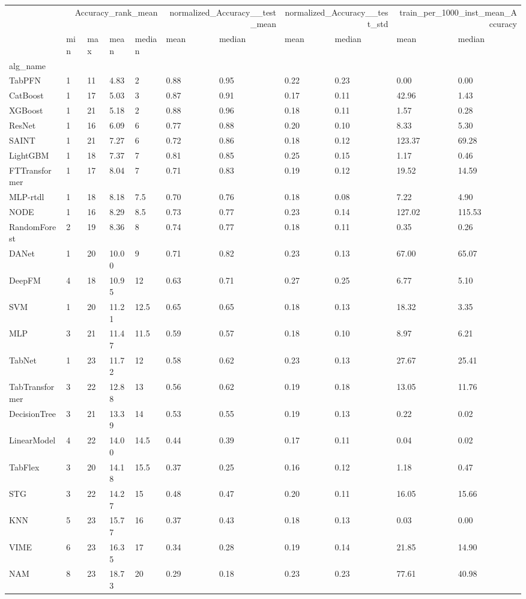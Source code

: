 \begin{tabular}{lllllllllll}
\toprule
 & \multicolumn{4}{r}{Accuracy_rank_mean} & \multicolumn{2}{r}{normalized_Accuracy__test_mean} & \multicolumn{2}{r}{normalized_Accuracy__test_std} & \multicolumn{2}{r}{train_per_1000_inst_mean_Accuracy} \\
 & min & max & mean & median & mean & median & mean & median & mean & median \\
alg_name &  &  &  &  &  &  &  &  &  &  \\
\midrule
TabPFN & 1 & 11 & 4.83 & 2 & 0.88 & 0.95 & 0.22 & 0.23 & 0.00 & 0.00 \\
CatBoost & 1 & 17 & 5.03 & 3 & 0.87 & 0.91 & 0.17 & 0.11 & 42.96 & 1.43 \\
XGBoost & 1 & 21 & 5.18 & 2 & 0.88 & 0.96 & 0.18 & 0.11 & 1.57 & 0.28 \\
ResNet & 1 & 16 & 6.09 & 6 & 0.77 & 0.88 & 0.20 & 0.10 & 8.33 & 5.30 \\
SAINT & 1 & 21 & 7.27 & 6 & 0.72 & 0.86 & 0.18 & 0.12 & 123.37 & 69.28 \\
LightGBM & 1 & 18 & 7.37 & 7 & 0.81 & 0.85 & 0.25 & 0.15 & 1.17 & 0.46 \\
FTTransformer & 1 & 17 & 8.04 & 7 & 0.71 & 0.83 & 0.19 & 0.12 & 19.52 & 14.59 \\
MLP-rtdl & 1 & 18 & 8.18 & 7.5 & 0.70 & 0.76 & 0.18 & 0.08 & 7.22 & 4.90 \\
NODE & 1 & 16 & 8.29 & 8.5 & 0.73 & 0.77 & 0.23 & 0.14 & 127.02 & 115.53 \\
RandomForest & 2 & 19 & 8.36 & 8 & 0.74 & 0.77 & 0.18 & 0.11 & 0.35 & 0.26 \\
DANet & 1 & 20 & 10.00 & 9 & 0.71 & 0.82 & 0.23 & 0.13 & 67.00 & 65.07 \\
DeepFM & 4 & 18 & 10.95 & 12 & 0.63 & 0.71 & 0.27 & 0.25 & 6.77 & 5.10 \\
SVM & 1 & 20 & 11.21 & 12.5 & 0.65 & 0.65 & 0.18 & 0.13 & 18.32 & 3.35 \\
MLP & 3 & 21 & 11.47 & 11.5 & 0.59 & 0.57 & 0.18 & 0.10 & 8.97 & 6.21 \\
TabNet & 1 & 23 & 11.72 & 12 & 0.58 & 0.62 & 0.23 & 0.13 & 27.67 & 25.41 \\
TabTransformer & 3 & 22 & 12.88 & 13 & 0.56 & 0.62 & 0.19 & 0.18 & 13.05 & 11.76 \\
DecisionTree & 3 & 21 & 13.39 & 14 & 0.53 & 0.55 & 0.19 & 0.13 & 0.22 & 0.02 \\
LinearModel & 4 & 22 & 14.00 & 14.5 & 0.44 & 0.39 & 0.17 & 0.11 & 0.04 & 0.02 \\
TabFlex & 3 & 20 & 14.18 & 15.5 & 0.37 & 0.25 & 0.16 & 0.12 & 1.18 & 0.47 \\
STG & 3 & 22 & 14.27 & 15 & 0.48 & 0.47 & 0.20 & 0.11 & 16.05 & 15.66 \\
KNN & 5 & 23 & 15.77 & 16 & 0.37 & 0.43 & 0.18 & 0.13 & 0.03 & 0.00 \\
VIME & 6 & 23 & 16.35 & 17 & 0.34 & 0.28 & 0.19 & 0.14 & 21.85 & 14.90 \\
NAM & 8 & 23 & 18.73 & 20 & 0.29 & 0.18 & 0.23 & 0.23 & 77.61 & 40.98 \\
\bottomrule
\end{tabular}
